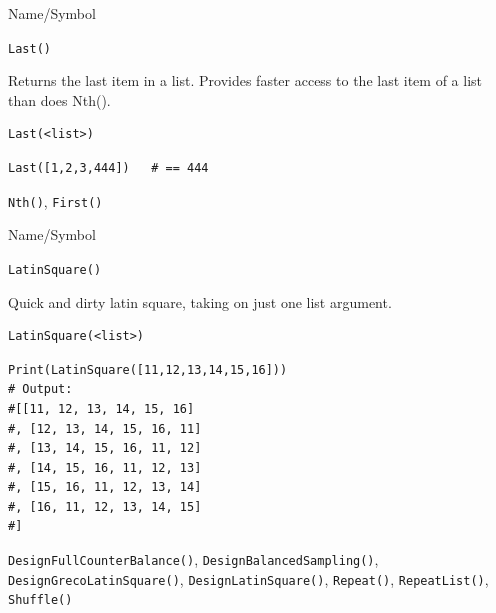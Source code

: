 \begin{desc}{Name/Symbol}
\item[Name/Symbol]	\verb+Last()+

\item[Description]	Returns the last item in a list. Provides faster 
		access to the last item of a list than does Nth().

\item[Usage]
\begin{verbatim}
Last(<list>)
\end{verbatim}

\item[Example]
\begin{verbatim}
Last([1,2,3,444])	# == 444
\end{verbatim}

\item[See Also]	\verb+Nth()+, \verb+First()+
\end{desc}




\begin{desc}{Name/Symbol}
\item[Name/Symbol]	\verb+LatinSquare()+

\item[Description]	Quick and dirty latin square, taking on just one
  list argument.

\item[Usage]
\begin{verbatim}
LatinSquare(<list>)
\end{verbatim}

\item[Example]
\begin{verbatim}
Print(LatinSquare([11,12,13,14,15,16]))
# Output:
#[[11, 12, 13, 14, 15, 16]
#, [12, 13, 14, 15, 16, 11]
#, [13, 14, 15, 16, 11, 12]
#, [14, 15, 16, 11, 12, 13]
#, [15, 16, 11, 12, 13, 14]
#, [16, 11, 12, 13, 14, 15]
#]

\end{verbatim}

\item[See Also] \verb+DesignFullCounterBalance()+,
  \verb+DesignBalancedSampling()+, \verb+DesignGrecoLatinSquare()+,
  \verb+DesignLatinSquare()+, \verb+Repeat()+, \verb+RepeatList()+,
  \verb+Shuffle()+

\end{desc}


